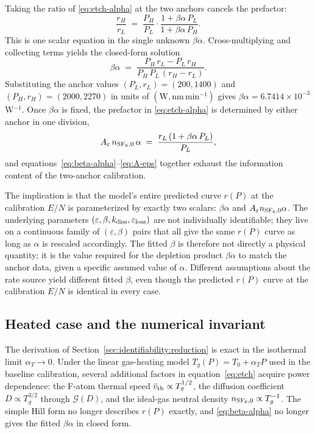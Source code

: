 Taking the ratio of \eqref{eq:etch-alpha} at the two anchors
cancels the prefactor:
\begin{equation}
  \frac{r_H}{r_L}
  \;=\;
  \frac{P_H}{P_L}\cdot
  \frac{1 + \beta\alpha\,P_L}{1 + \beta\alpha\,P_H}.
  \label{eq:ratio-constraint}
\end{equation}
This is one scalar equation in the single unknown $\beta\alpha$.
Cross-multiplying and collecting terms yields the closed-form
solution
\begin{equation}
  \beta\alpha
  \;=\;
  \frac{P_H\,r_L - P_L\,r_H}{P_H\,P_L\,(r_H - r_L)}.
  \label{eq:beta-alpha}
\end{equation}
Substituting the anchor values
$(P_L,r_L) = (200,1400)$ and $(P_H,r_H) = (2000,2270)$ in units of
$(\mathrm{W},\mathrm{nm\,min^{-1}})$ gives
$\beta\alpha = 6.7414\times10^{-3}\,$W$^{-1}$. Once $\beta\alpha$
is fixed, the prefactor in \eqref{eq:etch-alpha} is determined by
either anchor in one division,
\begin{equation}
  A_\varepsilon\,n_{\mathrm{SF}_6,0}\,\alpha
  \;=\;
  \frac{r_L\,(1 + \beta\alpha\,P_L)}{P_L},
  \label{eq:A-eps}
\end{equation}
and equations~\eqref{eq:beta-alpha}--\eqref{eq:A-eps} together
exhaust the information content of the two-anchor calibration.

The implication is that the model's entire predicted curve $r(P)$
at the calibration $E/N$ is parameterized by exactly two scalars:
$\beta\alpha$ and $A_\varepsilon n_{\mathrm{SF}_6,0}\alpha$. The underlying
parameters $(\varepsilon, \beta, k_{\mathrm{diss}},
\varepsilon_{\mathrm{loss}})$ are not individually identifiable;
they live on a continuous family of $(\varepsilon,\beta)$ pairs
that all give the same $r(P)$ curve as long as $\alpha$ is rescaled
accordingly. The fitted $\beta$ is therefore not directly a
physical quantity; it is the value required for the depletion
product $\beta\alpha$ to match the anchor data, given a specific
assumed value of $\alpha$. Different assumptions about the rate
source yield different fitted $\beta$, even though the predicted
$r(P)$ curve at the calibration $E/N$ is identical in every case.

\subsection{Heated case and the numerical invariant}
\label{sec:identifiability:heated}

The derivation of
Section~\ref{sec:identifiability:reduction} is exact in the
isothermal limit $\alpha_T \to 0$. Under the linear gas-heating
model $T_g(P) = T_0 + \alpha_T P$ used in the baseline calibration,
several additional factors in equation~\eqref{eq:etch} acquire
power dependence: the F-atom thermal speed
$\bar v_{\mathrm{th}} \propto T_g^{1/2}$, the diffusion coefficient
$D \propto T_g^{3/2}$ through $\mathcal{G}(D)$, and the ideal-gas
neutral density $n_{\mathrm{SF}_6,0} \propto T_g^{-1}$. The simple Hill form
no longer describes $r(P)$ exactly, and
\eqref{eq:beta-alpha} no longer gives the fitted $\beta\alpha$ in
closed form.

